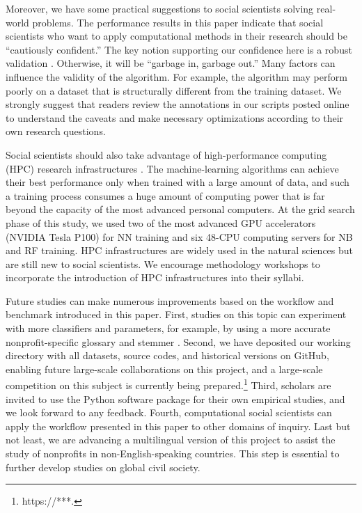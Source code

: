\documentclass[11pt]{article}
\begin{document}
Moreover, we have some practical suggestions to social scientists solving real-world problems. The performance results in this paper indicate that social scientists who want to apply computational methods in their research should be ``cautiously confident.'' The key notion supporting our confidence here is a robust validation \parencite[271]{GrimmerTextDataPromise2013}. Otherwise, it will be ``garbage in, garbage out.'' Many factors can influence the validity of the algorithm. For example, the algorithm may perform poorly on a dataset that is structurally different from the training dataset. We strongly suggest that readers review the annotations in our scripts posted online to understand the caveats and make necessary optimizations according to their own research questions.

Social scientists should also take advantage of high-performance computing (HPC) research infrastructures \parencite[e.g.,][]{KeaheyChameleonScalableProduction2018}. The machine-learning algorithms can achieve their best performance only when trained with a large amount of data, and such a training process consumes a huge amount of computing power that is far beyond the capacity of the most advanced personal computers. At the grid search phase of this study, we used two of the most advanced GPU accelerators (NVIDIA Tesla P100) for NN training and six 48-CPU computing servers for NB and RF training. HPC infrastructures are widely used in the natural sciences but are still new to social scientists. We encourage methodology workshops to incorporate the introduction of HPC infrastructures into their syllabi.

Future studies can make numerous improvements based on the workflow and benchmark introduced in this paper. First, studies on this topic can experiment with more classifiers and parameters, for example, by using a more accurate nonprofit-specific glossary and stemmer \parencite{PaxtonNonprofitSpecificGlossaryStemmer2019}. Second, we have deposited our working directory with all datasets, source codes, and historical versions on GitHub, enabling future large-scale collaborations on this project, and a large-scale competition on this subject is currently being prepared.\footnote{https://***.} Third, scholars are invited to use the Python software package for their own empirical studies, and we look forward to any feedback. Fourth, computational social scientists can apply the workflow presented in this paper to other domains of inquiry. Last but not least, we are advancing a multilingual version of this project to assist the study of nonprofits in non-English-speaking countries. This step is essential to further develop studies on global civil society.
\end{document}
